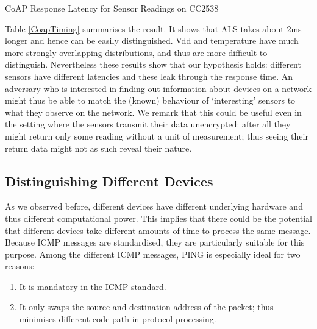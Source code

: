 \documentclass{article}
\begin{document}
\begin{table}
	\center
	
	\caption{CoAP Response Latency for Sensor Readings on CC2538\label{CoapTiming}}
\end{table}

Table \ref{CoapTiming} summarises the result. It shows that ALS takes about $2$ms longer and hence can be easily distinguished. Vdd and temperature have much more strongly overlapping distributions, and thus are more difficult to distinguish. Nevertheless these results show that our hypothesis holds: different sensors have different latencies and these leak through the response time. An adversary who is interested in finding out information about devices on a network might thus be able to match the (known) behaviour of `interesting' sensors to what they observe on the network. We remark that this could be useful even in the setting where the sensors transmit their data unencrypted: after all they might return only some reading without a unit of measurement; thus seeing their return data might not as such reveal their nature. 


\subsection{Distinguishing Different Devices}

As we observed before, different devices have different underlying hardware and thus different computational power. This implies that there could be the potential that different devices take different amounts of time to process the same message. Because ICMP messages are standardised, they are particularly suitable for this purpose. Among the different ICMP messages, PING is especially ideal for two reasons: 
\begin{enumerate}
	\item It is mandatory in the ICMP standard.
	\item It only swaps the source and destination address of the packet; thus minimises different code path in protocol processing.
\end{enumerate}
\end{document}

